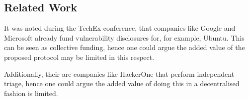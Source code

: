 \subsection{Related Work}
It was noted during the TechEx conference, that companies like Google and Microsoft already fund vulnerability disclosures for, for example, Ubuntu. This can be seen as collective funding, hence one could argue the added value of the proposed protocol may be limited in this respect.

Additionally, their are companies like HackerOne that perform independent triage, hence one could argue the added value of doing this in a decentralised fashion is limited.